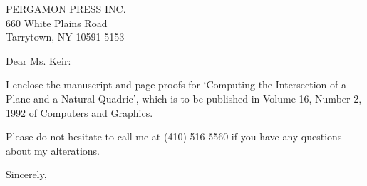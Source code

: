 \signature{John K. Johnstone\\jj@cs.jhu.edu}

\begin{letter}
{PERGAMON PRESS INC.\\
660 White Plains Road\\
Tarrytown, NY  10591-5153\\
}

\noindent \opening{Dear Ms. Keir:}

I enclose the manuscript and page proofs for
`Computing the Intersection of a Plane and a Natural Quadric',
which is to be published in 
Volume 16, Number 2, 1992 of Computers and Graphics.

Please do not hesitate to call me at (410) 516-5560 if you have any questions
about my alterations. 

\closing{Sincerely,}
\end{letter}


